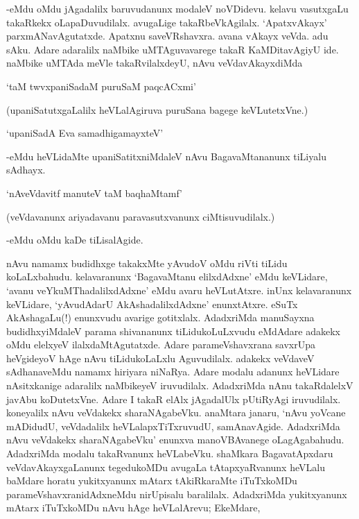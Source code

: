 -eMdu oMdu jAgadalilx baruvudanunx modaleV noVDidevu. kelavu vasutxgaLu takaRkekx oLapaDuvudilalx. avugaLige takaRbeVkAgilalx. `ApatxvAkayx' parxmANavAgutatxde. Apatxnu saveVRshavxra. avana vAkayx veVda. adu sAku. Adare adaralilx naMbike uMTAguvavarege takaR KaMDitavAgiyU ide. naMbike uMTAda meVle takaRvilalxdeyU, nAvu veVdavAkayxdiMda

\begin{shloka}
`taM twvxpaniSadaM puruSaM paqcACxmi'
\end{shloka}

(upaniSatutxgaLalilx heVLalAgiruva puruSana bagege keVLutetxVne.)

\begin{shloka}
`upaniSadA Eva samadhigamayxteV'
\end{shloka}

-eMdu heVLidaMte upaniSatitxniMdaleV nAvu BagavaMtananunx tiLiyalu sAdhayx.

\begin{shloka}
`nAveVdavitf manuteV taM baqhaMtamf'
\end{shloka}

(veVdavanunx ariyadavanu paravasutxvanunx ciMtisuvudilalx.)

-eMdu oMdu kaDe tiLisalAgide.

nAvu namamx budidhxge takakxMte yAvudoV oMdu riVti tiLidu koLaLxbahudu. kelavaranunx `BagavaMtanu elilxdAdxne' eMdu keVLidare, `avanu veYkuMThadalilxdAdxne' eMdu avaru heVLutAtxre. inUnx kelavaranunx keVLidare, `yAvudAdarU AkAshadalilxdAdxne' enunxtAtxre. eSuTx AkAshagaLu(!) enunxvudu avarige gotitxlalx. AdadxriMda manuSayxna budidhxyiMdaleV parama shivananunx tiLidukoLuLxvudu eMdAdare adakekx oMdu elelxyeV ilalxdaMtAgutatxde. Adare parameVshavxrana savxrUpa heVgideyoV hAge nAvu tiLidukoLaLxlu Aguvudilalx. adakekx veVdaveV sAdhanaveMdu namamx hiriyara niNaRya. Adare modalu adanunx heVLidare nAsitxkanige adaralilx naMbikeyeV iruvudilalx. AdadxriMda nAnu takaRdalelxV javAbu koDutetxVne. Adare I takaR elAlx jAgadalUlx pUtiRyAgi iruvudilalx. koneyalilx nAvu veVdakekx sharaNAgabeVku. anaMtara janaru, `nAvu yoVcane mADidudU, veVdadalilx heVLalapxTiTxruvudU, samAnavAgide. AdadxriMda nAvu veVdakekx sharaNAgabeVku' enunxva manoVBAvanege oLagAgabahudu. AdadxriMda modalu takaRvanunx heVLabeVku. shaMkara BagavatApxdaru veVdavAkayxgaLanunx tegedukoMDu avugaLa tAtapxyaRvanunx heVLalu baMdare horatu yukitxyanunx mAtarx tAkiRkaraMte iTuTxkoMDu parameVshavxranidAdxneMdu nirUpisalu baralilalx. AdadxriMda yukitxyanunx mAtarx iTuTxkoMDu nAvu hAge heVLalArevu; EkeMdare, 

